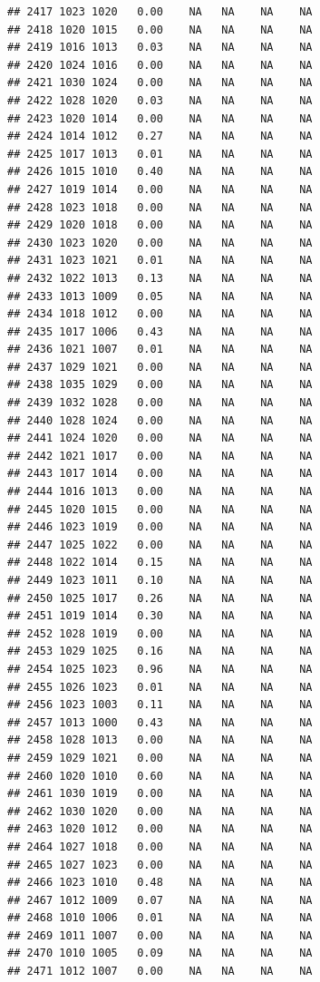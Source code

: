 \documentclass{article}\usepackage{graphicx, color}
\makeatletter
\newenvironment{kframe}{%
 \def\at@end@of@kframe{}%
 \ifinner\ifhmode%
  \def\at@end@of@kframe{\end{minipage}}%
  \begin{minipage}{\columnwidth}%
 \fi\fi%
 \def\FrameCommand##1{\hskip\@totalleftmargin \hskip-\fboxsep
 \colorbox{shadecolor}{##1}\hskip-\fboxsep
     \hskip-\linewidth \hskip-\@totalleftmargin \hskip\columnwidth}%
 \MakeFramed {\advance\hsize-\width
   \@totalleftmargin\z@ \linewidth\hsize
   \@setminipage}}%
 {\par\unskip\endMakeFramed%
 \at@end@of@kframe}
\newenvironment{knitrout}{}{} %
\makeatother
\begin{document}
\begin{knitrout}
\begin{kframe}
\begin{verbatim}
## 2417 1023 1020   0.00    NA   NA    NA    NA
## 2418 1020 1015   0.00    NA   NA    NA    NA
## 2419 1016 1013   0.03    NA   NA    NA    NA
## 2420 1024 1016   0.00    NA   NA    NA    NA
## 2421 1030 1024   0.00    NA   NA    NA    NA
## 2422 1028 1020   0.03    NA   NA    NA    NA
## 2423 1020 1014   0.00    NA   NA    NA    NA
## 2424 1014 1012   0.27    NA   NA    NA    NA
## 2425 1017 1013   0.01    NA   NA    NA    NA
## 2426 1015 1010   0.40    NA   NA    NA    NA
## 2427 1019 1014   0.00    NA   NA    NA    NA
## 2428 1023 1018   0.00    NA   NA    NA    NA
## 2429 1020 1018   0.00    NA   NA    NA    NA
## 2430 1023 1020   0.00    NA   NA    NA    NA
## 2431 1023 1021   0.01    NA   NA    NA    NA
## 2432 1022 1013   0.13    NA   NA    NA    NA
## 2433 1013 1009   0.05    NA   NA    NA    NA
## 2434 1018 1012   0.00    NA   NA    NA    NA
## 2435 1017 1006   0.43    NA   NA    NA    NA
## 2436 1021 1007   0.01    NA   NA    NA    NA
## 2437 1029 1021   0.00    NA   NA    NA    NA
## 2438 1035 1029   0.00    NA   NA    NA    NA
## 2439 1032 1028   0.00    NA   NA    NA    NA
## 2440 1028 1024   0.00    NA   NA    NA    NA
## 2441 1024 1020   0.00    NA   NA    NA    NA
## 2442 1021 1017   0.00    NA   NA    NA    NA
## 2443 1017 1014   0.00    NA   NA    NA    NA
## 2444 1016 1013   0.00    NA   NA    NA    NA
## 2445 1020 1015   0.00    NA   NA    NA    NA
## 2446 1023 1019   0.00    NA   NA    NA    NA
## 2447 1025 1022   0.00    NA   NA    NA    NA
## 2448 1022 1014   0.15    NA   NA    NA    NA
## 2449 1023 1011   0.10    NA   NA    NA    NA
## 2450 1025 1017   0.26    NA   NA    NA    NA
## 2451 1019 1014   0.30    NA   NA    NA    NA
## 2452 1028 1019   0.00    NA   NA    NA    NA
## 2453 1029 1025   0.16    NA   NA    NA    NA
## 2454 1025 1023   0.96    NA   NA    NA    NA
## 2455 1026 1023   0.01    NA   NA    NA    NA
## 2456 1023 1003   0.11    NA   NA    NA    NA
## 2457 1013 1000   0.43    NA   NA    NA    NA
## 2458 1028 1013   0.00    NA   NA    NA    NA
## 2459 1029 1021   0.00    NA   NA    NA    NA
## 2460 1020 1010   0.60    NA   NA    NA    NA
## 2461 1030 1019   0.00    NA   NA    NA    NA
## 2462 1030 1020   0.00    NA   NA    NA    NA
## 2463 1020 1012   0.00    NA   NA    NA    NA
## 2464 1027 1018   0.00    NA   NA    NA    NA
## 2465 1027 1023   0.00    NA   NA    NA    NA
## 2466 1023 1010   0.48    NA   NA    NA    NA
## 2467 1012 1009   0.07    NA   NA    NA    NA
## 2468 1010 1006   0.01    NA   NA    NA    NA
## 2469 1011 1007   0.00    NA   NA    NA    NA
## 2470 1010 1005   0.09    NA   NA    NA    NA
## 2471 1012 1007   0.00    NA   NA    NA    NA

\end{verbatim}
\end{kframe}
\end{knitrout}
\end{document}
